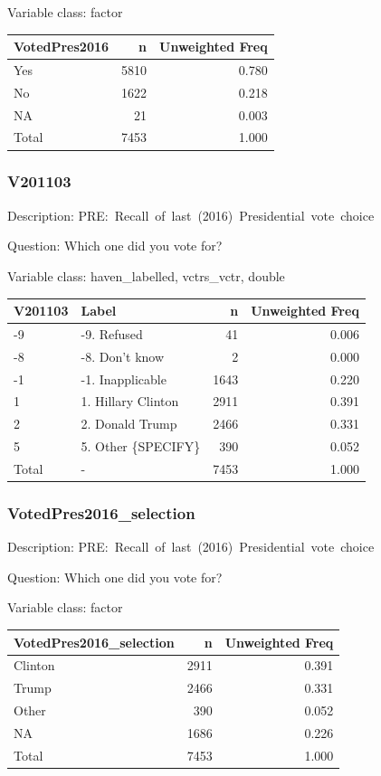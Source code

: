 \documentclass[
]{krantz}
\begin{document}
Variable class: factor

\begin{tabular}[t]{l|r|r}
\hline
VotedPres2016 & n & Unweighted Freq\\
\hline
Yes & 5810 & 0.780\\
\hline
No & 1622 & 0.218\\
\hline
NA & 21 & 0.003\\
\hline
Total & 7453 & 1.000\\
\hline
\end{tabular}

\hypertarget{v201103}{%
\subsubsection*{V201103}\label{v201103}}


Description: PRE:~Recall~of~last~(2016)~Presidential~vote~choice

Question: Which one did you vote for?

Variable class: haven\_labelled, vctrs\_vctr, double

\begin{tabular}[t]{l|l|r|r}
\hline
V201103 & Label & n & Unweighted Freq\\
\hline
-9 & -9. Refused & 41 & 0.006\\
\hline
-8 & -8. Don't know & 2 & 0.000\\
\hline
-1 & -1. Inapplicable & 1643 & 0.220\\
\hline
1 & 1. Hillary Clinton & 2911 & 0.391\\
\hline
2 & 2. Donald Trump & 2466 & 0.331\\
\hline
5 & 5. Other \{SPECIFY\} & 390 & 0.052\\
\hline
Total & - & 7453 & 1.000\\
\hline
\end{tabular}

\hypertarget{votedpres2016_selection}{%
\subsubsection*{VotedPres2016\_selection}\label{votedpres2016_selection}}


Description: PRE:~Recall~of~last~(2016)~Presidential~vote~choice

Question: Which one did you vote for?

Variable class: factor

\begin{tabular}[t]{l|r|r}
\hline
VotedPres2016\_selection & n & Unweighted Freq\\
\hline
Clinton & 2911 & 0.391\\
\hline
Trump & 2466 & 0.331\\
\hline
Other & 390 & 0.052\\
\hline
NA & 1686 & 0.226\\
\hline
Total & 7453 & 1.000\\
\hline
\end{tabular}
\end{document}

